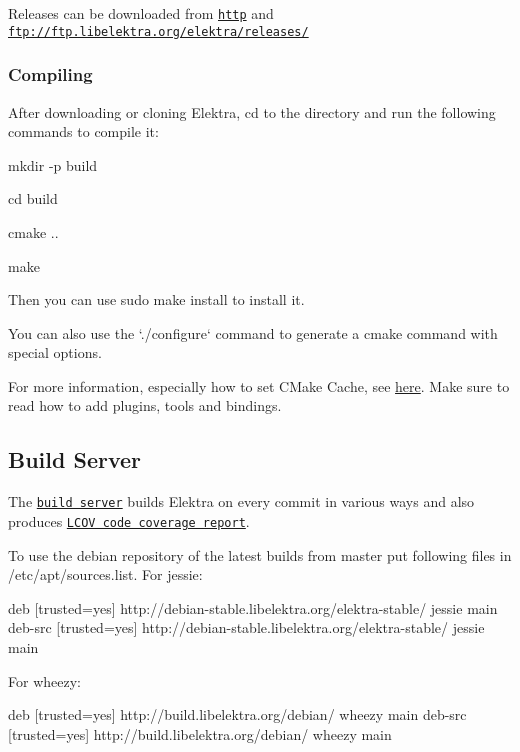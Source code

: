 Releases can be downloaded from \href{http://www.libelektra.org/ftp/elektra/releases/}{\tt http} and {\ttfamily \href{ftp://ftp.libelektra.org/elektra/releases/}{\tt ftp\+://ftp.\+libelektra.\+org/elektra/releases/}}

\subsubsection*{Compiling}

After downloading or cloning Elektra, {\ttfamily cd} to the directory and run the following commands to compile it\+:


\begin{DoxyItemize}
\item {\ttfamily mkdir -\/p build}
\item {\ttfamily cd build}
\item {\ttfamily cmake ..}
\item {\ttfamily make}
\end{DoxyItemize}

Then you can use {\ttfamily sudo make install} to install it.

You can also use the `./configure` command to generate a {\ttfamily cmake} command with special options.

For more information, especially how to set C\+Make Cache, see \hyperlink{doc_COMPILE_md}{here}. Make sure to read how to add plugins, tools and bindings.

\subsection*{Build Server}

The \href{http://build.libelektra.org:8080/}{\tt build server} builds Elektra on every commit in various ways and also produces \href{http://doc.libelektra.org/coverage/latest}{\tt L\+C\+O\+V code coverage report}.

To use the debian repository of the latest builds from master put following files in /etc/apt/sources.list. For jessie\+: \begin{DoxyVerb}    deb     [trusted=yes] http://debian-stable.libelektra.org/elektra-stable/ jessie main
    deb-src [trusted=yes] http://debian-stable.libelektra.org/elektra-stable/ jessie main
\end{DoxyVerb}


For wheezy\+: \begin{DoxyVerb}     deb     [trusted=yes] http://build.libelektra.org/debian/ wheezy main
     deb-src [trusted=yes] http://build.libelektra.org/debian/ wheezy main
\end{DoxyVerb}


